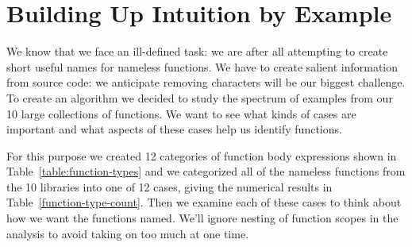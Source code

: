 \documentclass[10pt, preprint]{sigplanconf}
\begin{document}
\section{Building Up Intuition by Example}
\label{sec:intuition}
We know that we face an ill-defined task: we are after all attempting to create short useful names for nameless functions. We have to create salient information from source code: we anticipate removing characters will be our biggest challenge.  To create an algorithm we decided to study the spectrum of examples from our 10 large collections of functions. We want to see what kinds of cases are important and what aspects of these cases help us identify functions.

For this purpose we created 12 categories of function body expressions shown in Table~\ref{table:function-types} and we categorized all of the nameless functions from the 10 libraries into one of 12 cases, giving the numerical results in Table~\ref{function-type-count}.  Then we examine each of these cases to think about how we want the functions named. We'll ignore nesting of function scopes in the analysis to avoid taking on too much at one time.
  
\end{document}
